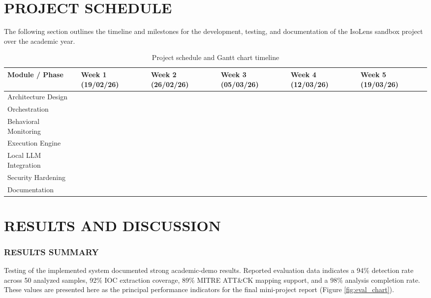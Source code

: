 \documentclass[a4paper,12pt,oneside]{report}
\begin{document}
\chapter{PROJECT SCHEDULE}
The following section outlines the timeline and milestones for the development, testing, and documentation of the IsoLens sandbox project over the academic year.

\begin{table}[H]
\centering
\caption{Project schedule and Gantt chart timeline}
\label{tab:project_schedule}
\renewcommand{\arraystretch}{1.5}
\setlength{\tabcolsep}{3pt}
\begin{tabularx}{\textwidth}{>{\raggedright\arraybackslash}X >{\centering\arraybackslash}p{2cm} >{\centering\arraybackslash}p{2cm} >{\centering\arraybackslash}p{2cm} >{\centering\arraybackslash}p{2cm} >{\centering\arraybackslash}p{2cm}}
\toprule
\rowcolor{black!10}
\textbf{Module / Phase} & \textbf{Week 1 \newline(19/02/26)} & \textbf{Week 2 \newline(26/02/26)} & \textbf{Week 3 \newline(05/03/26)} & \textbf{Week 4 \newline(12/03/26)} & \textbf{Week 5 \newline(19/03/26)} \\
\midrule
Architecture Design & \cellcolor{black!70} & & & & \\
Orchestration & \cellcolor{black!70} & \cellcolor{black!70} & & & \\
Behavioral Monitoring & & \cellcolor{black!70} & \cellcolor{black!70} & & \\
Execution Engine & & & \cellcolor{black!70} & & \\
Local LLM Integration & & & & \cellcolor{black!70} & \\
Security Hardening & & & & \cellcolor{black!70} & \cellcolor{black!70} \\
Documentation & & & & & \cellcolor{black!70} \\
\bottomrule
\end{tabularx}
\end{table}


\chapter{RESULTS AND DISCUSSION}
\subsection{RESULTS SUMMARY}
Testing of the implemented system documented strong academic-demo results. Reported evaluation data indicates a 94\% detection rate across 50 analyzed samples, 92\% IOC extraction coverage, 89\% MITRE ATT\&CK mapping support, and a 98\% analysis completion rate. These values are presented here as the principal performance indicators for the final mini-project report (Figure \ref{fig:eval_chart}).
\end{document}

